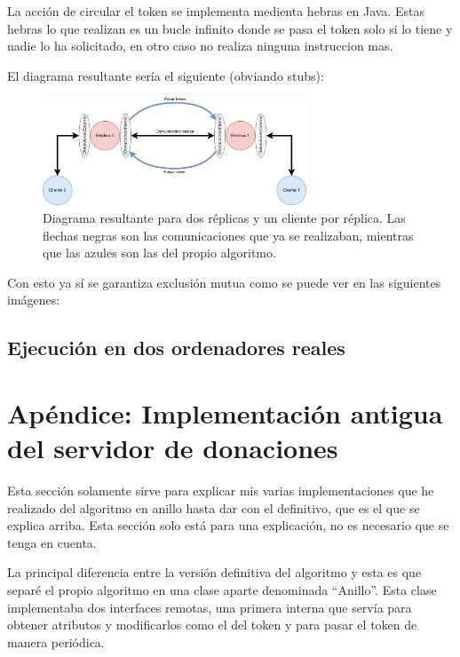 \documentclass{article}
\begin{document}
La acción de circular el token se implementa medienta hebras en Java. Estas hebras lo que realizan es un bucle infinito donde se pasa el token solo si lo tiene y nadie lo ha solicitado, en otro caso no realiza ninguna instruccion mas.

El diagrama resultante sería el siguiente (obviando stubs):

\begin{figure}[H]
    \centering
    \includegraphics[width=0.7\textwidth]{imagenes/diagramaAnillo.png}
    \caption{Diagrama resultante para dos réplicas y un cliente por réplica. Las flechas negras son las comunicaciones que ya se realizaban, mientras que las azules son las del propio algoritmo.}
\end{figure}

Con esto ya sí se garantiza exclusión mutua como se puede ver en las siguientes imágenes:




\subsection{Ejecución en dos ordenadores reales}

\section{Apéndice: Implementación antigua del servidor de donaciones}
Esta sección solamente sirve para explicar mis varias implementaciones que he realizado del algoritmo en anillo hasta dar con el definitivo, que es el que se explica arriba. Esta sección solo está para una explicación, no es necesario que se tenga en cuenta.

La principal diferencia entre la versión definitiva del algoritmo y esta es que separé el propio algoritmo en una clase aparte denominada ``Anillo''. Esta clase implementaba dos interfaces remotas, una primera interna que servía para obtener atributos y modificarlos como el del token y para pasar el token de manera periódica.
\end{document}
